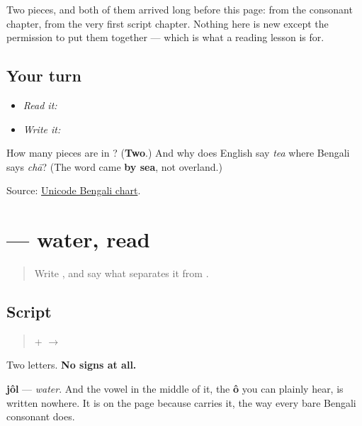 Two pieces, and both of them arrived long before this page: \textbf{} from the consonant chapter, \textbf{} from the very first script chapter. Nothing here is new except the permission to put them together — which is what a reading lesson is for.

\subsection*{Your turn}
\begin{itemize}
\raggedright
  \item \emph{Read it:} 
  \item \emph{Write it:} 
\end{itemize}

\begin{tcolorbox}[breakable,colback=teal!4,colframe=teal!35!black,title={Before you move on}]
How many pieces are in \textbf{}? (\textbf{Two}.) And why does English say \emph{tea} where Bengali says \emph{chā}? (The word came \textbf{by sea}, not overland.)

Source: \href{https://www.unicode.org/charts/PDF/U0980.pdf}{Unicode Bengali chart}.
\end{tcolorbox}
\section[\texorpdfstring{\bn{জল} (jôl)}{জল (jôl)}]{ — water, read}

\label{lesson:BN-W04-jol-read}



\begin{quote}
Write \textbf{}, and say what separates it from \textbf{}.
\end{quote}

\subsection*{Script}
\begin{quote}
\textbf{} + \textbf{} $\to$ \textbf{}
\end{quote}

Two letters. \textbf{No signs at all.}

\textbf{jôl} — \emph{water}. And the vowel in the middle of it, the \textbf{ô} you can plainly hear, is written nowhere. It is on the page because \textbf{} carries it, the way every bare Bengali consonant does.


